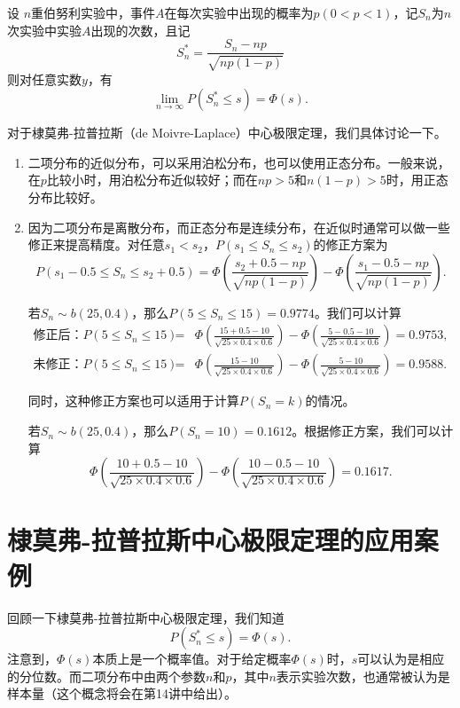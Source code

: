 \begin{theorem}
   设 $n$重伯努利实验中，事件$A$在每次实验中出现的概率为$p(0<p<1)$，记$S_n$为$n$次实验中实验$A$出现的次数，且记
   $$
   S_n^{\ast} = \frac{S_n - np}{\sqrt{np(1-p)}}
   $$
   则对任意实数$y$，有
   $$
\lim_{n\rightarrow \infty} P(S_n^{\ast} \leq s) = \Phi(s).
   $$
\end{theorem}
\begin{remark}对于棣莫弗-拉普拉斯（de Moivre-Laplace）中心极限定理，我们具体讨论一下。
\begin{enumerate}
    \item 二项分布的近似分布，可以采用泊松分布，也可以使用正态分布。一般来说，在$p$比较小时，用泊松分布近似较好；而在$np>5$和$n(1-p)>5$时，用正态分布比较好。
    \item 因为二项分布是离散分布，而正态分布是连续分布，在近似时通常可以做一些修正来提高精度。对任意$s_1<s_2$，$P(s_1 \leq S_n \leq s_2)$的修正方案为
    $$
    P(s_1-0.5 \leq S_n \leq s_2+0.5) = \Phi\left(\frac{s_2+0.5 - np}{\sqrt{np(1-p)}}\right) - \Phi\left(\frac{s_1 - 0.5 - np}{\sqrt{np(1-p)}}\right).
    $$
    \begin{example}
        若$S_n \sim b(25,0.4)$，那么$P(5\leq S_n \leq 15) = 0.9774$。我们可以计算
        \begin{eqnarray*}
            \text{修正后：}P(5\leq S_n \leq 15) &=& \Phi\left(\frac{15+0.5 - 10}{\sqrt{25\times 0.4\times 0.6}}\right) -\Phi\left(\frac{5-0.5 - 10}{\sqrt{25\times 0.4\times0.6}}\right) = 0.9753,\\
             \text{未修正：}P(5\leq S_n \leq 15) &=& \Phi\left(\frac{15 - 10}{\sqrt{25\times 0.4\times 0.6}}\right) -\Phi\left(\frac{5 - 10}{\sqrt{25\times 0.4\times 0.6}}\right) = 0.9588.
            \end{eqnarray*}
    \end{example}
    同时，这种修正方案也可以适用于计算$P(S_n = k)$的情况。
    \begin{example}
         若$S_n \sim b(25,0.4)$，那么$P(S_n = 10) = 0.1612$。根据修正方案，我们可以计算
         $$
         \Phi\left(\frac{10+0.5 - 10}{\sqrt{25\times 0.4\times 0.6}}\right) -\Phi\left(\frac{10-0.5 - 10}{\sqrt{25\times 0.4\times 0.6}}\right) = 0.1617.
         $$
    \end{example}
\end{enumerate}
\end{remark}
\section{棣莫弗-拉普拉斯中心极限定理的应用案例}
回顾一下棣莫弗-拉普拉斯中心极限定理，我们知道
$$
P(S_n^{\ast} \leq s) = \Phi(s).
$$
注意到，$\Phi(s)$本质上是一个概率值。对于给定概率$\Phi(s)$时，$s$可以认为是相应的分位数。而二项分布中由两个参数$n$和$p$，其中$n$表示实验次数，也通常被认为是样本量（这个概念将会在第14讲中给出）。

